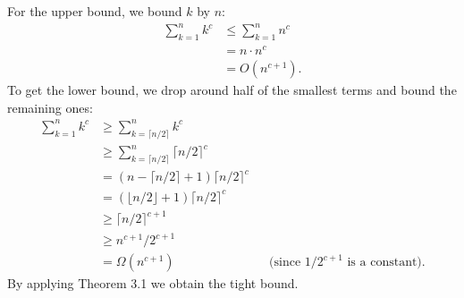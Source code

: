 For the upper bound, we bound $k$ by $n$:
\begin{align*}
    \sum_{k=1}^n k^c &\le \sum_{k=1}^n n^c \\
    &= n\cdot n^c \\
    &= O(n^{c+1}).
\end{align*}
To get the lower bound, we drop around half of the smallest terms and bound the remaining ones:
\begin{align*}
    \sum_{k=1}^n k^c &\ge \sum_{k=\lceil n/2\rceil}^{n} k^c \\
    &\ge \sum_{k=\lceil n/2\rceil}^{n} \lceil n/2\rceil^c \\
    &= (n-\lceil n/2\rceil+1)\lceil n/2\rceil^c \\
    &= (\lfloor n/2\rfloor+1)\lceil n/2\rceil^c \\
    &\ge \lceil n/2\rceil^{c+1} \\
    &\ge n^{c+1}\!/2^{c+1} \\
    &= \Omega(n^{c+1}) && \text{(since $1/2^{c+1}$ is a constant)}.
\end{align*}
By applying Theorem 3.1 we obtain the tight bound.
